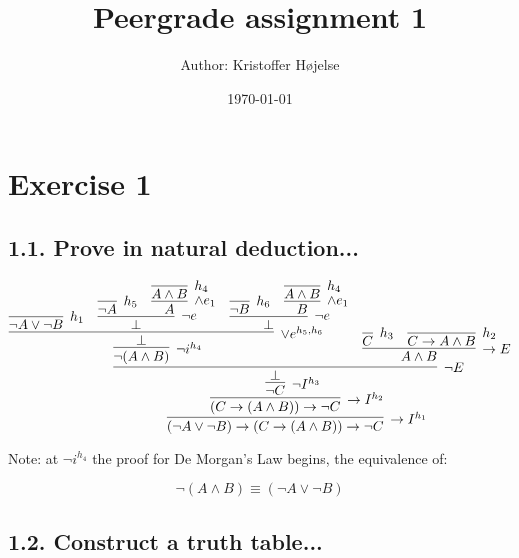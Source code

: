 \documentclass[a4paper,11pt]{article}
\title{Peergrade assignment 1}
\author{Author: Kristoffer Højelse}
\date{\today}
\begin{document}
 

\maketitle

\section*{Exercise 1}

\subsection*{1.1. Prove in natural deduction...}

$$
\infer[ \to I^{h_1} ]{ (\neg A \lor \neg B) \to (C \to (A \land B)) \to \neg C }{
    \infer[ \to I^{h_2} ]{ (C \to (A \land B)) \to \neg C }{
        \infer[ \neg I^{h_3} ]{ \neg C }{
            \infer[\neg E]{ \bot }{
                \infer[\neg i^{h_4}]{ \neg ( A \land B) }{
                    \infer[ \lor e^{h_5 , h_6} ]{\bot}{
                        \infer[h_1]{\neg A \lor \neg B}{}
                        &
                        \infer[\neg e]{\bot}{
                            \infer[h_5]{\neg A}{}
                            &
                            \infer[\land e_1]{A}{
                                \infer[h_4]{A \land B}{}
                            }
                        }
                        &
                        \infer[\neg e]{\bot}{
                            \infer[h_6]{\neg B}{}
                            &
                            \infer[\land e_1]{B}{
                                \infer[h_4]{A \land B}{}
                            }
                        }
                    }
                }
                &
                \infer[\to E]{A \land B}{
                    \infer[h_3]{C}{}
                    &
                    \infer[h_2]{C \to A \land B}{}
                }
            }
        }
    }
}
$$

Note: at $\neg i^{h_4}$ the proof for De Morgan's Law begins, the equivalence of:

$$\neg(A \land B) \equiv (\neg A \lor \neg B) $$

\subsection*{1.2. Construct a truth table...}
\end{document}
